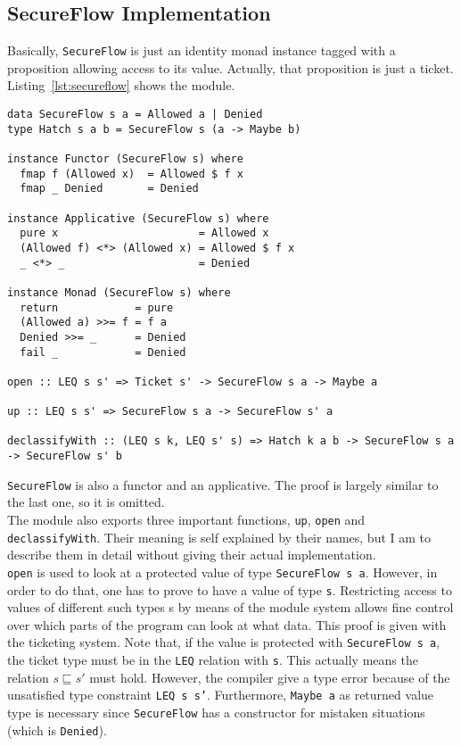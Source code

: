 \subsection{SecureFlow Implementation}
Basically, \texttt{SecureFlow} is just an identity monad instance tagged with a proposition allowing access to its value. Actually, that proposition is just a ticket. Listing~\ref{lst:secureflow} shows the module.
\begin{lstlisting}[caption={SecureFlow monad}, label={lst:secureflow}, breaklines=true]
data SecureFlow s a = Allowed a | Denied
type Hatch s a b = SecureFlow s (a -> Maybe b)

instance Functor (SecureFlow s) where
  fmap f (Allowed x)  = Allowed $ f x
  fmap _ Denied       = Denied

instance Applicative (SecureFlow s) where
  pure x                      = Allowed x
  (Allowed f) <*> (Allowed x) = Allowed $ f x
  _ <*> _                     = Denied

instance Monad (SecureFlow s) where
  return            = pure
  (Allowed a) >>= f = f a
  Denied >>= _      = Denied
  fail _            = Denied
  
open :: LEQ s s' => Ticket s' -> SecureFlow s a -> Maybe a

up :: LEQ s s' => SecureFlow s a -> SecureFlow s' a

declassifyWith :: (LEQ s k, LEQ s' s) => Hatch k a b -> SecureFlow s a -> SecureFlow s' b
\end{lstlisting}
%
%

\texttt{SecureFlow} is also a functor and an applicative. The proof is largely similar to the last one, so it is omitted. \\
The module also exports three important functions, \texttt{up}, \texttt{open} and \texttt{declassifyWith}. Their meaning is self explained by their names, but I am to describe them in detail without giving their actual implementation. \\
\texttt{open} is used to look at a protected value of type \texttt{SecureFlow s a}. However, in order to do that, one has to prove to have a value of type \texttt{s}. Restricting access to values of different such types s by means of the module system allows fine control over which parts of the program can look at what data. This proof is given with the ticketing system. Note that, if the value is protected with \texttt{SecureFlow s a}, the ticket type must be in the \texttt{LEQ} relation with \texttt{s}. This actually means the relation $s \sqsubseteq s'$ must hold. However, the compiler give a type error because of the unsatisfied type constraint \texttt{LEQ s s'}. Furthermore, \texttt{Maybe a} as returned value type is necessary since \texttt{SecureFlow} has a constructor for mistaken situations (which is \texttt{Denied}). \\

